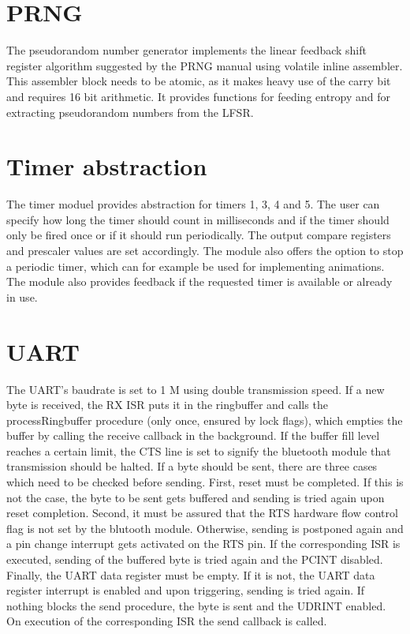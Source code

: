 \documentclass[12pt,a4paper,titlepage,oneside]{article}
\begin{document}
\section{PRNG}

The pseudorandom number generator implements the linear feedback shift register
algorithm suggested by the PRNG manual using volatile inline assembler. This
assembler block needs to be atomic, as it makes heavy use of the carry bit 
and requires 16 bit arithmetic. It provides functions for feeding entropy and 
for extracting pseudorandom numbers from the LFSR.

\section{Timer abstraction}

The timer moduel provides abstraction for timers 1, 3, 4 and 5. The user can
specify how long the timer should count in milliseconds and if the timer should
only be fired once or if it should run periodically. The output compare registers
and prescaler values are set accordingly. The module also offers the option to
stop a periodic timer, which can for example be used for implementing animations. 
The module also provides feedback if the requested timer is available or already in use.

\section{UART}

The UART's baudrate is set to 1 M using double transmission speed. If a new
byte is received, the RX ISR puts it in the ringbuffer and calls the
processRingbuffer procedure (only once, ensured by lock flags), which empties
the buffer by calling the receive callback in the background. If the buffer fill level reaches a certain
limit, the CTS line is set to signify the bluetooth module that transmission
should be halted. If a byte should be sent, there are three cases which need
to be checked before sending. First, reset must be completed. If this is not
the case, the byte to be sent gets buffered and sending is tried again upon
reset completion. Second, it must be assured that the RTS hardware flow control
flag is not set by the blutooth module. Otherwise, sending is postponed again
and a pin change interrupt gets activated on the RTS pin. If the corresponding ISR
is executed, sending of the buffered byte is tried again and the PCINT disabled.
Finally, the UART data register must be empty. If it is not, the UART data register
interrupt is enabled and upon triggering, sending is tried again. If nothing
blocks the send procedure, the byte is sent and the UDRINT enabled. On
execution of the corresponding ISR the send callback is called.
\end{document}
